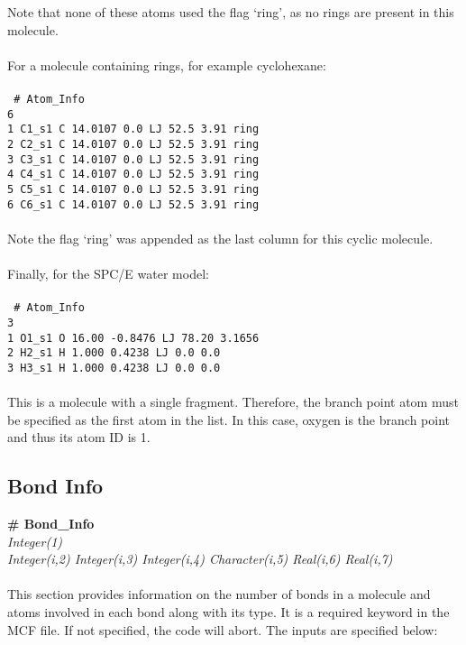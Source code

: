 {{{Note that none of these atoms used the flag `ring', as no rings
are present in this molecule. \\ \\
%
For a molecule containing rings, for example cyclohexane: \\ \\
%
\texttt{
\# Atom\_Info \\
6\\
1    C1\_s1    C    14.0107    0.0    LJ    52.5    3.91 ring\\
2    C2\_s1    C    14.0107    0.0    LJ    52.5    3.91 ring\\
3    C3\_s1    C    14.0107    0.0    LJ    52.5    3.91 ring\\
4    C4\_s1    C    14.0107    0.0    LJ    52.5    3.91 ring\\
5    C5\_s1    C    14.0107    0.0    LJ    52.5    3.91 ring\\
6    C6\_s1    C    14.0107    0.0    LJ    52.5    3.91 ring\\
}
\\
%
Note the flag `ring' was appended as the last column for this cyclic molecule. \\ \\
%
Finally, for the SPC/E water model:  \\ \\
%
\texttt{
\# Atom\_Info\\
3\\
1    O1\_s1    O    16.00     -0.8476    LJ    78.20   3.1656\\
2    H2\_s1    H    1.000      0.4238    LJ    0.0 0.0\\
3    H3\_s1    H    1.000      0.4238    LJ    0.0 0.0\\
} \\ 
%
This is a molecule with a single fragment. Therefore, the branch point atom
must be specified as the first atom in the list. In this case, oxygen is the 
branch point and thus its atom ID is 1.

\subsection{Bond Info}\label{sec:Get_Bond_Info}
%
{\bf \# Bond\_Info} \\
{\it Integer(1)} \\
{\it Integer(i,2) Integer(i,3) Integer(i,4) Character(i,5) Real(i,6) Real(i,7)} \\
\\
This section provides information on the number of bonds in a molecule
and atoms involved in each bond along with its type.  It is a required keyword in the MCF file. If not specified, the code
will abort. The inputs are specified below: \\ 
%
\begin{itemize}


\end{itemize}}}}
